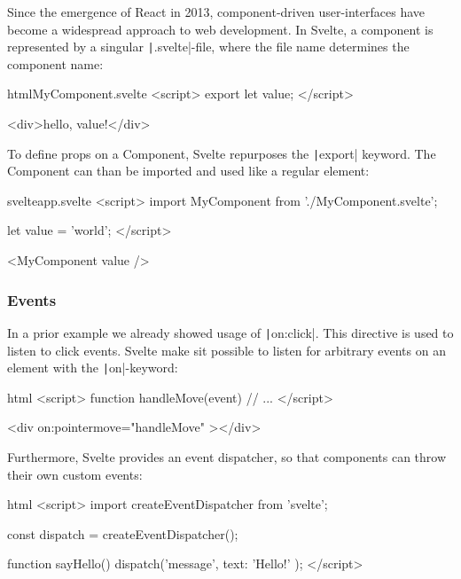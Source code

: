 
Since the emergence of React in 2013, component-driven user-interfaces have become a widespread approach to web development. In Svelte, a component is represented by a singular \texttt|.svelte|-file, where the file name determines the component name: 

\begin{myminted}{html}{MyComponent.svelte}
<script>
    export let value;
</script>

<div>hello, {value}!</div>
\end{myminted}

To define props on a Component, Svelte repurposes the \texttt|export| keyword. The Component can than be imported and used like a regular element:

\begin{myminted}{svelte}{app.svelte}
<script>
    import MyComponent from './MyComponent.svelte';

    let value = 'world';
</script>

<MyComponent {value} />
\end{myminted}

\subsubsection{Events}


In a prior example we already showed usage of \texttt|on:click|. This directive is used to listen to click events. Svelte make sit possible to listen for arbitrary events on an element with the \texttt|on|-keyword:

\begin{myminted}[highlightlines={7}]{html}{}
<script>
    function handleMove(event) {
        // ...
    }
</script>

<div on:pointermove="{handleMove}" ></div>
\end{myminted}

Furthermore, Svelte provides an event dispatcher, so that components can throw their own custom events:

\begin{myminted}{html}{}
<script>
    import { createEventDispatcher } from 'svelte';

    const dispatch = createEventDispatcher();

    function sayHello() {
        dispatch('message', {
            text: 'Hello!'
        });
    }
</script>
\end{myminted}

